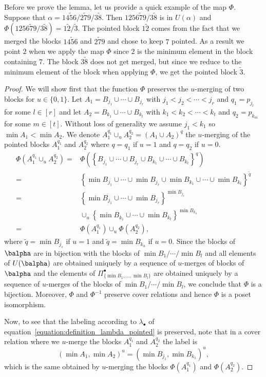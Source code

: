 Before we prove the lemma, let us provide a quick example of the map $\Phi$. Suppose that $\alpha = 14\tilde{5}6/ 2\tilde{7}9/3\tilde{8}$.  Then $1256\tilde{7}9/ 3\tilde{8}$ is in $U(\alpha)$ and $\Phi(1256\tilde{7}9/ 3\tilde{8}) = 1\tilde{2}/\tilde{3}$.  The pointed block $1\tilde{2}$ comes from the fact that we merged the blocks $14\tilde{5}6$ and $ 2\tilde{7}9$ and chose to keep $7$ pointed. As a result we point $2$ when we apply the map $\Phi$ since $2$ is the minimum element in the block containing $7$.  The block $3\tilde{8}$ does not get merged, but since we reduce to the minimum element of the block when applying $\Phi$, we get the pointed block $\tilde{3}$.

\begin{proof}
We will show first that the function $\Phi$ preserves the $u$-merging of two blocks for $u\in \{0,1\}$. Let $A_1=B_{j_1}\cup\cdots \cup B_{j_r}$ with $j_1<j_2<\cdots <j_r$ and $q_1=p_{j_l}$ for some $l\in [r]$ and let $A_2=B_{k_1}\cup\cdots \cup B_{k_t}$ with $k_1<k_2<\cdots <k_t$ and $q_2=p_{k_m}$ for some $m\in [t]$. Without loss of generality we assume $j_1<k_1$ so $\min A_1 < \min A_2$. 
We denote $A_1^{q_1}\cup_{u} A_2^{q_2}=(A_1\cup A_2)^{q}$ the $u$-merging of the pointed blocks $A_1^{q_1}$ and $A_2^{q_2}$ where $q=q_1$ if $u=1$ and $q=q_2$ if $u=0$. 
\begin{align*}
     \Phi(A_1^{q_1}\cup_u A_2^{q_2})=&\Phi(\left\{ B_{j_1}\cup\cdots \cup  B_{j_r}\cup  B_{k_1}\cup\cdots \cup  B_{k_t}\right\}^{q})\\
     =&\left\{\min B_{j_1}\cup\cdots \cup \min B_{j_r}\cup \min B_{k_1}\cup\cdots \cup \min B_{k_t}\right\}^{\tilde q}\\
     =&\left\{\min B_{j_1}\cup\cdots \cup \min B_{j_r}\right\}^{\min B_{j_s}}\\
     &\cup_u \left\{\min B_{k_1}\cup\cdots \cup \min B_{k_t}\right\}^{\min B_{k_u}}\\
     =&\Phi(A_1^{q_1})\cup_u \Phi(A_2^{q_2}), 
 \end{align*}
 where $\tilde q=\min B_{j_s}$ if $u=1$ and $\tilde q=\min B_{k_u}$ if $u=0$. Since the blocks of $\balpha$ are in bijection with the blocks of $\min B_1/\cdots/\min B_l$ and all elements of $U(\balpha)$ are obtained uniquely by a sequence of $u$-merges of blocks of $\balpha$ and the elements of $\Pi_{\{\min B_1, \dots, \min B_l\}}^{\bullet}$ are obtained uniquely by a sequence of $u$-merges of the blocks of $\min B_1/\cdots/\min B_l$, we conclude that $\Phi$ is a bijection.  Moreover, $\Phi$ and $\Phi^{-1}$ preserve cover relations and hence $\Phi$ is a poset isomorphism.
 
 Now, to see that the labeling  according to $\lambda_{\bullet}$ of equation~\eqref{equation:definition_lambda_pointed} is preserved, note that in a cover relation where we $u$-merge the blocks $A_1^{q_1}$ and $A_2^{q_2}$ the label is
 $$(\min A_1, \min A_2)^u=(\min B_{j_1},\min B_{k_1})^u,$$
 which is the same obtained by $u$-merging the blocks $\Phi(A_1^{q_1})$ and $\Phi(A_2^{q_2})$.
\end{proof}


